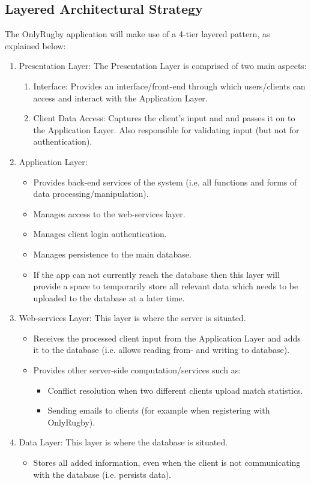 \documentclass[hidelinks,a4paper,12pt]{article}
\begin{document}
	\subsection{Layered Architectural Strategy}
	The OnlyRugby application will make use of a 4-tier layered pattern, as explained below:
	\begin{enumerate}
		\item Presentation Layer:
		The Presentation Layer is comprised of two main aspects:
		\begin{enumerate}
			\item Interface: Provides an interface/front-end through which users/clients can access and interact with the Application Layer.
			\item Client Data Access: Captures the client's input and and passes it on to the Application Layer. Also responsible for validating input (but not for authentication).
		\end {enumerate}
		\item Application Layer:
		\begin{itemize}
			\item Provides back-end services of the system (i.e. all functions and forms of data processing/manipulation).
			\item Manages access to the web-services layer.
			\item Manages client login authentication.
			\item Manages persistence to the main database.
			\item If the app can not currently reach the database then this layer will provide a space to temporarily store all relevant data which needs to be uploaded to the database at a later time.
		\end {itemize}
		\item Web-services Layer:
		This layer is where the server is situated.
		\begin{itemize}
			\item Receives the processed client input from the Application Layer and adds it to the database (i.e. allows reading from- and writing to database).
			\item Provides other server-side computation/services such as:
				\begin{itemize}
					\item Conflict resolution when two different clients upload match statistics.
					\item Sending emails to clients (for example when registering with OnlyRugby).
				\end{itemize}
		\end{itemize}
		\item Data Layer:
		This layer is where the database is situated.
		\begin{itemize}
			\item Stores all added information, even when the client is not communicating with the database (i.e. persists data).
		\end{itemize}


\end{enumerate}
\end{document}
